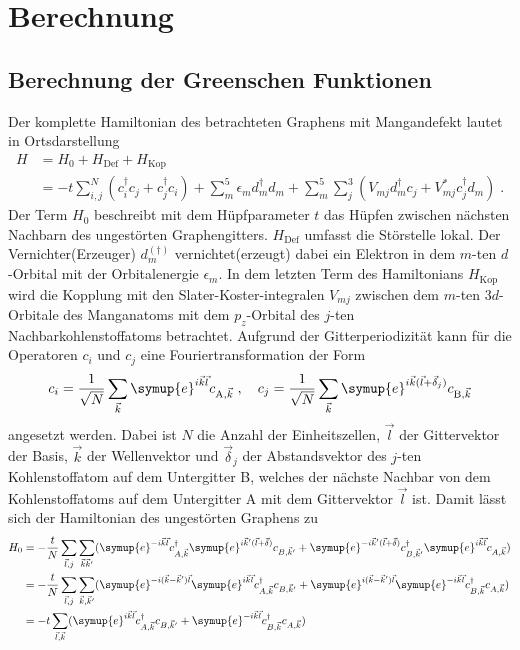 \chapter{Berechnung}
\label{chap:berechnung}
\section{Berechnung der Greenschen Funktionen}
\label{sec:calc_greensfunction}
Der komplette Hamiltonian des betrachteten Graphens mit Mangandefekt lautet in Ortsdarstellung 
\begin{align}
   H &=  H_0 + H_\text{Def} + H_\text{Kop}\\
    &=- t \sum_{i,j}^N \left ( c_i^\dagger c_j + c_j^\dagger c_i \right )  + \sum_m^5 \epsilon_m d_m^\dagger d_m
    + \sum_m^5 \sum_j^3 \left ( V_{mj} d_m^\dagger c_j + V^*_{mj} c_j^\dagger d_m \right )  \; \text{.} \label{eqn:full_Hamiltonian}
\end{align}
Der Term $H_0$ beschreibt mit dem Hüpfparameter $t$ das Hüpfen zwischen nächsten Nachbarn des ungestörten Graphengitters.
$H_\text{Def}$ umfasst die Störstelle lokal. Der Vernichter(Erzeuger) $d_m^{(\dagger)}$ vernichtet(erzeugt) dabei ein
Elektron in dem $m$-ten $d$-Orbital mit der Orbitalenergie\cite{anders-fkt} $\epsilon_m$.
In dem letzten Term des Hamiltonians $H_\text{Kop}$ wird die Kopplung mit den Slater-Koster-integralen
$V_{mj}$ zwischen dem $m$-ten $3d$-Orbitale des Manganatoms mit dem $p_z$-Orbital des $j$-ten Nachbarkohlenstoffatoms betrachtet.
Aufgrund der Gitterperiodizität kann für die Operatoren $c_i$ und $c_j$ eine Fouriertransformation der Form 
\begin{equation}
    c_i = \frac{1}{\sqrt{N}} \sum_{\vec{k}} \symup{e}^{i\vec{k}\vec{l}} c_{\text{A}, \vec{k}} \; , 
    \quad c_j = \frac{1}{\sqrt{N}} \sum_{\vec{k}} \symup{e}^{i\vec{k}(\vec{l}+\vec{\delta}_j)} c_{\text{B}, \vec{k}} \label{eqn:fourier_ladder}
\end{equation}
angesetzt werden.
Dabei ist $N$ die Anzahl der Einheitszellen, $\vec{l}$ der Gittervektor der Basis, $\vec{k}$ der Wellenvektor und $\vec{\delta}_j$ der Abstandsvektor
des $j$-ten Kohlenstoffatom auf dem Untergitter B, welches der nächste Nachbar von dem Kohlenstoffatoms auf dem Untergitter A mit dem Gittervektor $\vec{l}$ ist.
Damit lässt sich der Hamiltonian des ungestörten Graphens zu 
\begin{align*}
    H_0 &= -\frac{t}{N} \sum_{\vec{l}, j} \sum_{\vec{k}\vec{k}'} ( \symup{e}^{-i\vec{k}\vec{l}}c^\dagger_{A,\vec{k}} 
    \symup{e}^{i\vec{k}'(\vec{l}+\vec{\delta})}c_{B,\vec{k}'} + \symup{e}^{-i\vec{k}'(\vec{l}+\vec{\delta})} c^\dagger_{B,\vec{k}'} 
    \symup{e}^{i\vec{k}\vec{l}}c_{A,\vec{k}}) \\
    &= -\frac{t}{N} \sum_{\vec{l}, j} \sum_{\vec{k},\vec{k}'} ( \symup{e}^{-i(\vec{k}- \vec{k}')\vec{l}}\symup{e}^{i\vec{k}\vec{l}}c^\dagger_{A,\vec{k}} c_{B,\vec{k}'} + 
    \symup{e}^{i(\vec{k}- \vec{k}')\vec{l}} \symup{e}^{-i\vec{k}\vec{l}} c^\dagger_{B,\vec{k}}c_{A,\vec{k}}) \\
    &= -t \sum_{\vec{l}, \vec{k}} ( \symup{e}^{i\vec{k}\vec{l}}c^\dagger_{A,\vec{k}} c_{B,\vec{k}'} + 
    \symup{e}^{-i\vec{k}\vec{l}} c^\dagger_{B,\vec{k}}c_{A,\vec{k}})
\end{align*}
